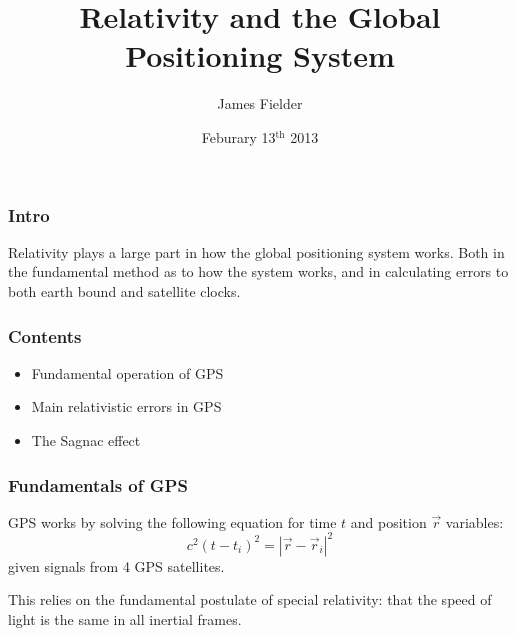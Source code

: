 \documentclass[xcolor=dvipsnames,usepdftitle=false]{beamer}
\begin{document}
\title{Relativity and the Global Positioning System}
\author{James Fielder}
\date{Feburary 13$^\text{th}$ 2013}

\begin{frame}[plane]

\titlepage

\end{frame}

\begin{frame}

\frametitle{Intro}

Relativity plays a large part in how the global positioning system works. Both in the fundamental method as to how the system works, and in calculating errors to both earth bound and satellite clocks.

\end{frame}

\begin{frame}

\frametitle{Contents}

\begin{itemize}
	\item Fundamental operation of GPS
	\item Main relativistic errors in GPS
	\item The Sagnac effect
\end{itemize}

\end{frame}

\begin{frame}

\frametitle{Fundamentals of GPS}

GPS works by solving the following equation for time $t$ and position $\vec{r}$ variables: \[ c^2 (t-t_i)^2 = |\vec{r}-\vec{r}_i|^2 \] 
given signals from 4 GPS satellites. \pause

\vspace{\baselineskip}

This relies on the fundamental postulate of special relativity: that the speed of light is the same in all inertial frames.

\end{frame}
\end{document}
